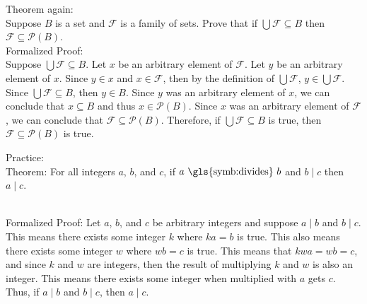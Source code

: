 \documentclass{article}
\begin{document}
\noindent Theorem again:\\
Suppose $B$ is a set and $\mathcal{F}$ is a family of sets. Prove that if $\bigcup \mathcal{F} \subseteq B$ then $\mathcal{F} \subseteq \mathcal{P}(B)$.\\

\noindent Formalized Proof:\\
Suppose $\bigcup \mathcal{F} \subseteq B$. Let $x$ be an arbitrary element of $\mathcal{F}$. Let $y$ be an arbitrary element of $x$. Since $y \in x$ and $x \in \mathcal{F}$, then by the definition of $\bigcup \mathcal{F}$, $y \in \bigcup \mathcal{F}$. Since $\bigcup \mathcal{F} \subseteq B$, then $y \in B$. Since $y$ was an arbitrary element of $x$, we can conclude that $x \subseteq B$ and thus $x \in \mathcal{P}(B)$. Since $x$ was an arbitrary element of $\mathcal{F}$, we can conclude that $\mathcal{F} \subseteq \mathcal{P}(B)$. Therefore, if $\bigcup \mathcal{F} \subseteq B$ is true, then $\mathcal{F} \subseteq \mathcal{P}(B)$ is true.

\noindent Practice:\\
Theorem: For all integers $a$, $b$, and $c$, if $a \text{ \gls{symb:divides} }b$ and $b \mid c$ then $a \mid c$.\\ 
\\
Formalized Proof: Let $a$, $b$, and $c$ be arbitrary integers and suppose $a \mid b$ and $b \mid c$. This means there exists some integer $k$ where $ka = b$ is true. This also means there exists some integer $w$ where $wb = c$ is true. This means that $kwa = wb = c$, and since $k$ and $w$ are integers, then the result of multiplying $k$ and $w$ is also an integer. This means there exists some integer when multiplied with $a$ gets $c$. Thus, if $a \mid b$ and $b \mid c$, then $a \mid c$.
\end{document}
